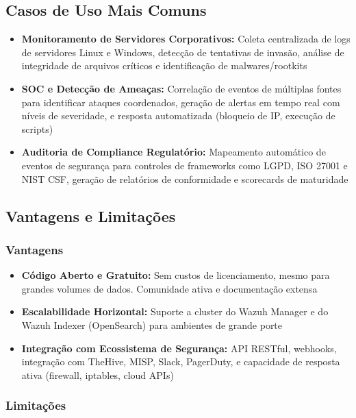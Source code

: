 \documentclass[12pt,a4paper]{article}
\begin{document}
    \subsection{Casos de Uso Mais Comuns}

    \begin{itemize}
        \item \textbf{Monitoramento de Servidores Corporativos:} Coleta centralizada de logs de servidores Linux e Windows, detecção de tentativas de invasão, análise de integridade de arquivos críticos e identificação de malwares/rootkits
        \item \textbf{SOC e Detecção de Ameaças:} Correlação de eventos de múltiplas fontes para identificar ataques coordenados, geração de alertas em tempo real com níveis de severidade, e resposta automatizada (bloqueio de IP, execução de scripts)
        \item \textbf{Auditoria de Compliance Regulatório:} Mapeamento automático de eventos de segurança para controles de frameworks como LGPD, ISO 27001 e NIST CSF, geração de relatórios de conformidade e scorecards de maturidade
    \end{itemize}

    \subsection{Vantagens e Limitações}

    \subsubsection{Vantagens}

    \begin{itemize}
        \item \textbf{Código Aberto e Gratuito:} Sem custos de licenciamento, mesmo para grandes volumes de dados. Comunidade ativa e documentação extensa
        \item \textbf{Escalabilidade Horizontal:} Suporte a cluster do Wazuh Manager e do Wazuh Indexer (OpenSearch) para ambientes de grande porte
        \item \textbf{Integração com Ecossistema de Segurança:} API RESTful, webhooks, integração com TheHive, MISP, Slack, PagerDuty, e capacidade de resposta ativa (firewall, iptables, cloud APIs)
    \end{itemize}

    \subsubsection{Limitações}
\end{document}
